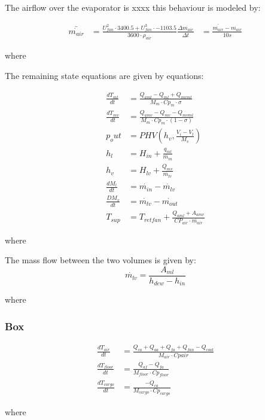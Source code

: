 The airflow over the evaporator is xxxx this behaviour is modeled by:

\begin{align}
	\bar{\dot{m_{air}}} & = \frac{U_{fan}^2 \cdot 3400.5 + U_{fan}^3 \cdot -1103.5} {3600 \cdot \rho_{air}}
	\frac{\Delta \dot{m_{air}}}{\Delta t} & = \frac{\bar{\dot{m_{air}}} - \dot{m_{air}}} {10s}
\end{align}

where

The remaining state equations are given by equations:

\begin{align}
	\frac{dT_{ml}}{dt} & = \frac{Q_{aml}-Q_{ml} + Q_{mvml}}{M_m \cdot Cp_m \cdot \sigma} \\
	\frac{dT_{mv}}{dt} & = \frac{Q_{amv} - Q_{mv} - Q_{mvml}}{M_m \cdot Cp_m \cdot (1- \sigma)} \\
	p_out & = PHV \left( h_v, \frac{V_i-V_l}{M_v} \right)\\
	h_l & = H_{in} + \frac{q_{ml}}{\dot{m_{in}}}\\
	h_v & = H_{lv} + \frac{Q_{mv}}{\dot{m_{lv}}}\\
	\frac{dM_l}{dt} & = \dot{m_{in}} - \dot{m_{lv}}\\
	\frac{DM_v}{dt} & = \dot{m_{lv}} - \dot{m_{out}}\\
	T_{sup} & = T_{retfan} +  \frac{Q_{aml} + A_{amv}}{CP_{air} \cdot \dot{m_{air}}}
\end{align}

where

The mass flow between the two volumes is given by:
\begin{equation}
	\dot{m_{lv}} = \frac{A_{ml}}{h_{dew} - h_{in}}
\end{equation}

where

\subsubsection{Box}

\begin{align}
	\frac{dT_{air}}{dt} & = \frac{Q_{ca} + Q_{aa} + Q_{fa} + Q_{fan} -Q_{cool}}{M_{air} \cdot Cp{air}} \\
	\frac{dT_{floor}}{dt} & = \frac{Q_{af} - Q_{fa}}{M_{floor} \cdot Cp_{floor}} \\
	\frac{dT_{cargo}}{dt} & = \frac{-Q_{ca}}{M_{cargo} \cdot Cp_{cargo}}
\end{align}

where

